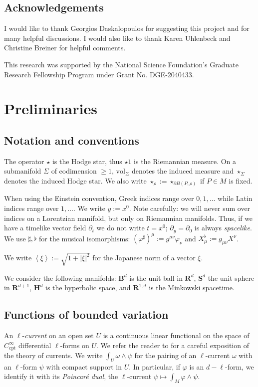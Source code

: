 \documentclass[final,12pt, leqno]{brownthesis}
\newcommand{\RR}{\mathbf{R}}
\newcommand{\Hyp}{\mathbf H}
\newcommand{\Sph}{\mathbf S}
\newcommand{\Ball}{\mathbf{B}}
\newcommand{\vol}{\mathrm{vol}}
\newcommand{\dfn}[1]{\emph{#1}\index{#1}}
\newcommand{\cpt}{\mathrm{cpt}}
\def\Japan#1{\left \langle #1 \right \rangle}
\theoremstyle{definition}
\numberwithin{equation}{section}
\begin{document}

\subsection{Acknowledgements}
I would like to thank Georgios Daskalopoulos for suggesting this project and for many helpful discussions.
I would also like to thank Karen Uhlenbeck and Christine Breiner for helpful comments.

This research was supported by the National Science Foundation's Graduate Research Fellowship Program under Grant No. DGE-2040433.



\section{Preliminaries}\label{Prelims}
\subsection{Notation and conventions}
The operator $\star$ is the Hodge star, thus $\star 1$ is the Riemannian measure.
On a submanifold $\Sigma$ of codimension $\geq 1$, $\vol_\Sigma$ denotes the induced measure and $\star_\Sigma$ denotes the induced Hodge star. We also write $\star_\rho := \star_{\partial B(P, \rho)}$ if $P \in M$ is fixed.

When using the Einstein convention, Greek indices range over $0, 1, \dots$ while Latin indices range over $1, \dots$.
We write $y := x^0$.
Note carefully: we will never sum over indices on a Lorentzian manifold, but only on Riemannian manifolds.
Thus, if we have a timelike vector field $\partial_t$ we do not write $t = x^0$; $\partial_y = \partial_0$ is always \emph{spacelike}.
We use $\sharp, \flat$ for the musical isomorphisms: $(\varphi^\sharp)^\mu := g^{\mu \nu} \varphi_\nu$ and $X^\flat_\mu := g_{\mu \nu} X^\nu$.

We write $\Japan \xi := \sqrt{1 + |\xi|^2}$ for the Japanese norm of a vector $\xi$.

We consider the following manifolds: $\Ball^d$ is the unit ball in $\RR^d$, $\Sph^d$ the unit sphere in $\RR^{d + 1}$, $\Hyp^d$ is the hyperbolic space, and $\RR^{1, d}$ is the Minkowski spacetime.

\subsection{Functions of bounded variation}
An $\ell$-\dfn{current} on an open set $U$ is a continuous linear functional on the space of $C^\infty_\cpt$ differential $\ell$-forms on $U$.
We refer the reader to \cite{simon1983GMT} for a careful exposition of the theory of currents.
We write $\int_U \omega \wedge \psi$ for the pairing of an $\ell$-current $\omega$ with an $\ell$-form $\psi$ with compact support in $U$.
In particular, if $\varphi$ is an $d-\ell$-form, we identify it with its \dfn{Poincar\'e dual}, the $\ell$-current $\psi \mapsto \int_M \varphi \wedge \psi$.
\end{document}
